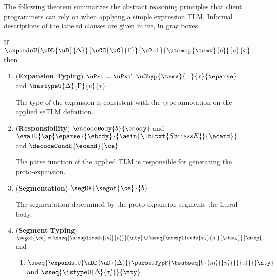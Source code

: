 \documentclass[acmsmall]{acmart}
\begin{document}
The following theorem summarizes the abstract reasoning principles that client programmers can rely on when applying a simple expression TLM. Informal descriptions of the labeled clauses are given inline, in gray boxes.
\noindent
\begin{theorem}\label{thm:setlm-reasoning} If $\expandsU{\uDD{\uD}{\Delta}}{\uGG{\uG}{\Gamma}}{\uPsi}{\utsmap{\tsmv}{b}}{e}{\tau}$ then
\begin{enumerate}[nolistsep,leftmargin=10pt,label={\arabic*.}]
\item (\textbf{Expansion Typing}) $\uPsi = \uPsi', \uShyp{\tsmv}{\_}{\tau}{\eparse}$ and $\hastypeU{\Delta}{\Gamma}{e}{\tau}$ 
  \begin{grayparbox}
     The type of the expansion is consistent with the type annotation on the applied seTLM definition.
  \end{grayparbox}
\item (\textbf{Responsibility}) $\encodeBody{b}{\ebody}$ and $\evalU{\ap{\eparse}{\ebody}}{\aein{\lbltxt{SuccessE}}{\ecand}}$ and $\decodeCondE{\ecand}{\ce}$
  \begin{grayparbox}
  The parse function of the applied TLM is responsible for generating the proto-expansion.
  \end{grayparbox}
\item (\textbf{Segmentation}) $\segOK{\segof{\ce}}{b}$ 
          \begin{grayparbox}
        The segmentation determined by the proto-expansion segments the literal body.
          \end{grayparbox}
\item (\textbf{Segment Typing})  $\segof{\ce} = \sseq{\acesplicedt{m'_i}{n'_i}}{\nty} \cup \sseq{\acesplicede{m_i}{n_i}{\ctau_i}}{\nexp}$ and
  \begin{enumerate}
  \item $\sseq{
        \expandsTU{\uDD{\uD}{\Delta}}
        {
          \parseUTypF{\bsubseq{b}{m'_i}{n'_i}}
        }{\tau'_i}
      }{\nty}$ and $\sseq{\istypeU{\Delta}{\tau'_i}}{\nty}$
          \begin{grayparbox}


\end{grayparbox}
\end{enumerate}
\end{enumerate}
\end{theorem}
\end{document}
